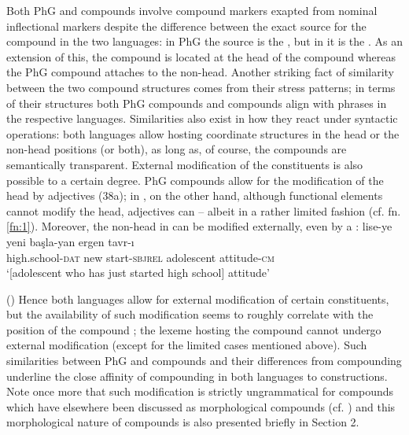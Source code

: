 \documentclass[output=paper]{LSP/langsci}
\begin{document}
Both PhG and  compounds involve compound markers exapted from nominal inflectional markers despite the difference between the exact source for the compound  in the two languages: in PhG the source is the , but in  it is the  . As an extension of this, the  compound  is located at the head of the compound whereas the PhG compound  attaches to the non-head. Another striking fact of similarity between the two compound structures comes from their stress patterns; in terms of their  structures both PhG compounds and  compounds align with  phrases in the respective languages. Similarities also exist in how they react under syntactic operations: both languages allow hosting coordinate structures in the head or the non-head positions (or both), as long as, of course, the compounds are semantically transparent. External modification of the constituents is also possible to a certain degree. PhG compounds allow for the modification of the head by adjectives (38a); in , on the other hand, although functional elements cannot modify the head, adjectives can -- albeit in a rather limited fashion (cf. fn. \ref{fn:1}). Moreover, the non-head in  can be modified externally, even by a :
\ea\label{ex:58}
	\gll lise-ye                 yeni  başla-yan       ergen           tavr-ı\\
		high.school-\textsc{dat}  new start-\textsc{sbjrel}  adolescent   attitude-\textsc{cm}\\
	\glt `[adolescent who has just started high school] attitude' 
	
	\hfill(\citealt{KamaliIkizoglu})  
\z
Hence both languages allow for external modification of certain constituents, but the availability of such modification seems to roughly correlate with the position of the compound ; the lexeme hosting the compound  cannot undergo external modification (except for the limited cases mentioned above). Such similarities between PhG and  compounds and their differences from  compounding underline the close affinity of compounding in both languages to  constructions. Note once more that such modification is strictly ungrammatical for  compounds which have elsewhere been discussed as morphological compounds (cf. \citealt{Ralli2013moderngreek}) and this morphological nature of  compounds is also presented briefly in Section 2.  
\end{document}

